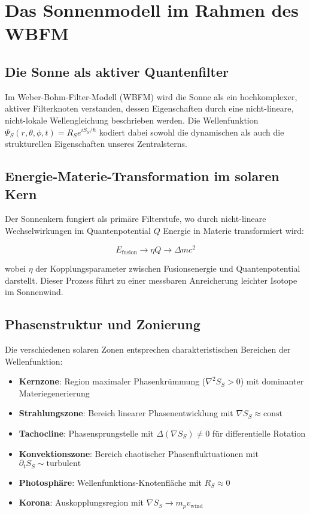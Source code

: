 \chapter{Das Sonnenmodell im Rahmen des WBFM}

\section{Die Sonne als aktiver Quantenfilter}

Im Weber-Bohm-Filter-Modell (WBFM) wird die Sonne als ein hochkomplexer, aktiver Filterknoten verstanden, dessen Eigenschaften durch eine nicht-lineare, nicht-lokale Wellengleichung beschrieben werden. Die Wellenfunktion \(\Psi_S(r, \theta, \phi, t) = R_S e^{iS_S/\hbar}\) kodiert dabei sowohl die dynamischen als auch die strukturellen Eigenschaften unseres Zentralsterns.

\section{Energie-Materie-Transformation im solaren Kern}

Der Sonnenkern fungiert als primäre Filterstufe, wo durch nicht-lineare Wechselwirkungen im Quantenpotential \(Q\) Energie in Materie transformiert wird:

\[
E_{\text{fusion}} \rightarrow \eta Q \rightarrow \Delta m c^2
\]

wobei \(\eta\) der Kopplungsparameter zwischen Fusionsenergie und Quantenpotential darstellt. Dieser Prozess führt zu einer messbaren Anreicherung leichter Isotope im Sonnenwind.

\section{Phasenstruktur und Zonierung}

Die verschiedenen solaren Zonen entsprechen charakteristischen Bereichen der Wellenfunktion:

\begin{itemize}
\item \textbf{Kernzone}: Region maximaler Phasenkrümmung (\(\nabla^2 S_S > 0\)) mit dominanter Materiegenerierung
\item \textbf{Strahlungszone}: Bereich linearer Phasenentwicklung mit \(\nabla S_S \approx \text{const}\)
\item \textbf{Tachocline}: Phasensprungstelle mit \(\Delta(\nabla S_S) \neq 0\) für differentielle Rotation
\item \textbf{Konvektionszone}: Bereich chaotischer Phasenfluktuationen mit \(\partial_t S_S \sim \text{turbulent}\)
\item \textbf{Photosphäre}: Wellenfunktions-Knotenfläche mit \(R_S \approx 0\)
\item \textbf{Korona}: Auskopplungsregion mit \(\nabla S_S \rightarrow m_p v_{\text{wind}}\)
\end{itemize}

